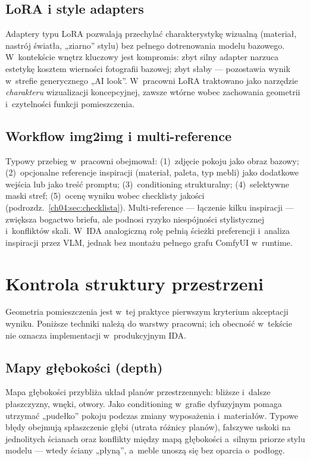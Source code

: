 \subsection{LoRA i style adapters}
\label{ch04:sec:lora}

Adaptery typu LoRA pozwalają przechylać charakterystykę wizualną (materiał, nastrój światła, „ziarno” stylu) bez pełnego dotrenowania modelu bazowego. W~kontekście wnętrz kluczowy jest kompromis: zbyt silny adapter narzuca estetykę kosztem wierności fotografii bazowej; zbyt słaby --- pozostawia wynik w~strefie generycznego „AI look”. W~pracowni LoRA traktowano jako narzędzie \emph{charakteru} wizualizacji koncepcyjnej, zawsze wtórne wobec zachowania geometrii i~czytelności funkcji pomieszczenia.

\subsection{Workflow img2img i multi-reference}
\label{ch04:sec:img2img}

Typowy przebieg w~pracowni obejmował: (1)~zdjęcie pokoju jako obraz bazowy; (2)~opcjonalne referencje inspiracji (materiał, paleta, typ mebli) jako dodatkowe wejścia lub jako treść promptu; (3)~conditioning strukturalny; (4)~selektywne maski stref; (5)~ocenę wyniku wobec checklisty jakości (podrozdz.~\ref{ch04:sec:checklista}). Multi-reference --- łączenie kilku inspiracji --- zwiększa bogactwo briefu, ale podnosi ryzyko niespójności stylistycznej i~konfliktów skali. W~IDA analogiczną rolę pełnią ścieżki preferencji i~analiza inspiracji przez VLM, jednak bez montażu pełnego grafu ComfyUI w~runtime.

\section{Kontrola struktury przestrzeni}
\label{ch04:sec:struktura}

Geometria pomieszczenia jest w~tej praktyce pierwszym kryterium akceptacji wyniku. Poniższe techniki należą do warstwy pracowni; ich obecność w~tekście nie oznacza implementacji w~produkcyjnym IDA.

\subsection{Mapy głębokości (depth)}
\label{ch04:sec:depth}

Mapa głębokości przybliża układ planów przestrzennych: bliższe i~dalsze płaszczyzny, wnęki, otwory. Jako conditioning w~grafie dyfuzyjnym pomaga utrzymać „pudełko” pokoju podczas zmiany wyposażenia i~materiałów. Typowe błędy obejmują spłaszczenie głębi (utrata różnicy planów), fałszywe uskoki na jednolitych ścianach oraz konflikty między mapą głębokości a~silnym priorze stylu modelu --- wtedy ściany „płyną”, a~meble unoszą się bez oparcia o~podłogę.

